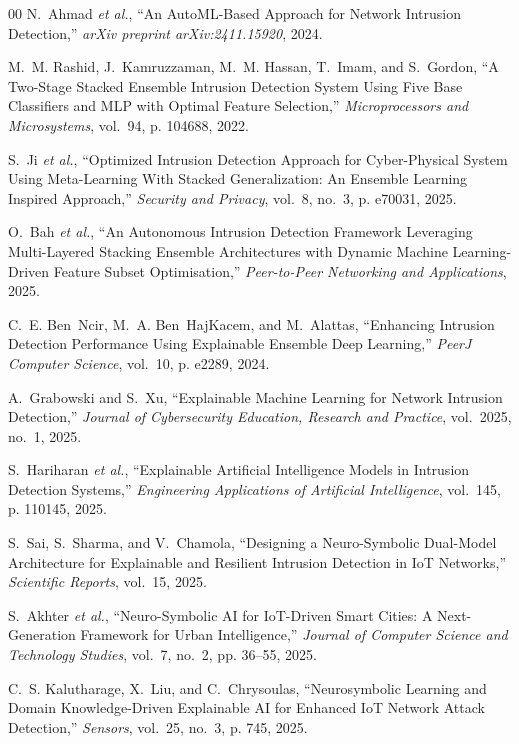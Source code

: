 \documentclass[pdflatex,sn-mathphys-num]{sn-jnl}
\theoremstyle{thmstyleone}
\theoremstyle{thmstyletwo}
\theoremstyle{thmstylethree}
\begin{document}
\begin{thebibliography}{00}
N.~Ahmad \emph{et al.}, ``An AutoML-Based Approach for Network Intrusion Detection,'' \emph{arXiv preprint arXiv:2411.15920}, 2024.

M.~M. Rashid, J.~Kamruzzaman, M.~M. Hassan, T.~Imam, and S.~Gordon, ``A Two-Stage Stacked Ensemble Intrusion Detection System Using Five Base Classifiers and MLP with Optimal Feature Selection,'' \emph{Microprocessors and Microsystems}, vol.~94, p. 104688, 2022.

S.~Ji \emph{et al.}, ``Optimized Intrusion Detection Approach for Cyber-Physical System Using Meta-Learning With Stacked Generalization: An Ensemble Learning Inspired Approach,'' \emph{Security and Privacy}, vol.~8, no.~3, p. e70031, 2025.

O.~Bah \emph{et al.}, ``An Autonomous Intrusion Detection Framework Leveraging Multi-Layered Stacking Ensemble Architectures with Dynamic Machine Learning-Driven Feature Subset Optimisation,'' \emph{Peer-to-Peer Networking and Applications}, 2025.

C.~E. Ben~Ncir, M.~A. Ben~HajKacem, and M.~Alattas, ``Enhancing Intrusion Detection Performance Using Explainable Ensemble Deep Learning,'' \emph{PeerJ Computer Science}, vol.~10, p. e2289, 2024.

A.~Grabowski and S.~Xu, ``Explainable Machine Learning for Network Intrusion Detection,'' \emph{Journal of Cybersecurity Education, Research and Practice}, vol.~2025, no.~1, 2025.

S.~Hariharan \emph{et al.}, ``Explainable Artificial Intelligence Models in Intrusion Detection Systems,'' \emph{Engineering Applications of Artificial Intelligence}, vol.~145, p. 110145, 2025.

S.~Sai, S.~Sharma, and V.~Chamola, ``Designing a Neuro-Symbolic Dual-Model Architecture for Explainable and Resilient Intrusion Detection in IoT Networks,'' \emph{Scientific Reports}, vol.~15, 2025.

S.~Akhter \emph{et al.}, ``Neuro-Symbolic AI for IoT-Driven Smart Cities: A Next-Generation Framework for Urban Intelligence,'' \emph{Journal of Computer Science and Technology Studies}, vol.~7, no.~2, pp. 36--55, 2025.

C.~S. Kalutharage, X.~Liu, and C.~Chrysoulas, ``Neurosymbolic Learning and Domain Knowledge-Driven Explainable AI for Enhanced IoT Network Attack Detection,'' \emph{Sensors}, vol.~25, no.~3, p. 745, 2025.


\end{thebibliography}
\end{document}
